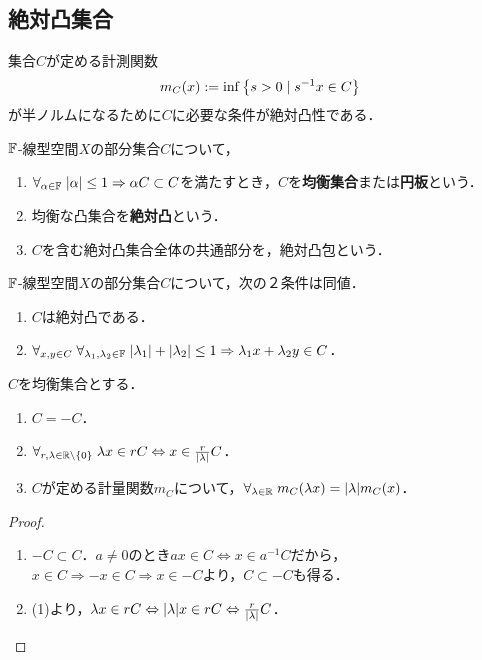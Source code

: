 \documentclass[uplatex,dvipdfmx]{jsreport}
\begin{document}
\subsection{絶対凸集合}

\begin{tcolorbox}[colframe=ForestGreen, colback=ForestGreen!10!white,breakable,colbacktitle=ForestGreen!40!white,coltitle=black,fonttitle=\bfseries\sffamily,
title=]
    集合$C$が定める計測関数
    \[m_C(x):=\inf\left\{s>0\mid s^{-1}x\in C\right\}\]
    が半ノルムになるために$C$に必要な条件が絶対凸性である．
\end{tcolorbox}

\begin{definition}
    $\mathbb{F}$-線型空間$X$の部分集合$C$について，
    \begin{enumerate}
        \item $\forall_{\alpha\in\mathbb{F}}\;\lvert\alpha\rvert\le 1\Rightarrow\alpha C\subset C$を満たすとき，$C$を\textbf{均衡集合}または\textbf{円板}という．
        \item 均衡な凸集合を\textbf{絶対凸}という．
        \item $C$を含む絶対凸集合全体の共通部分を，絶対凸包という．
    \end{enumerate}
\end{definition}

\begin{lemma}[絶対凸性の特徴付け]
    $\mathbb{F}$-線型空間$X$の部分集合$C$について，次の２条件は同値．
    \begin{enumerate}
        \item $C$は絶対凸である．
        \item $\forall_{x,y\in C}\;\forall_{\lambda_1,\lambda_2\in\mathbb{F}}\;\lvert\lambda_1\rvert+\lvert\lambda_2\rvert\le 1\Rightarrow \lambda_1x+\lambda_2y\in C$．
    \end{enumerate}
\end{lemma}

\begin{lemma}[均衡性]
    $C$を均衡集合とする．
    \begin{enumerate}
        \item $C=-C$．
        \item $\forall_{r,\lambda\in\mathbb{R}\setminus\{0\}}\;\lambda x\in rC\Leftrightarrow x\in\frac{r}{\lvert\lambda\rvert}C$．
        \item $C$が定める計量関数$m_C$について，$\forall_{\lambda\in\mathbb{R}}\;m_C(\lambda x)=\lvert\lambda\rvert m_C(x)$．
    \end{enumerate}
\end{lemma}
\begin{proof}\mbox{}
    \begin{enumerate}
        \item $-C\subset C$．$a\ne0$のとき$ax\in C\Leftrightarrow x\in a^{-1}C$だから，$x\in C\Rightarrow -x\in C\Rightarrow x\in -C$より，$C\subset-C$も得る．
        \item (1)より，$\lambda x\in rC\Leftrightarrow\lvert\lambda\rvert x\in rC\Leftrightarrow\frac{r}{\lvert\lambda\rvert}C$．
    \end{enumerate}
\end{proof}
\end{document}
